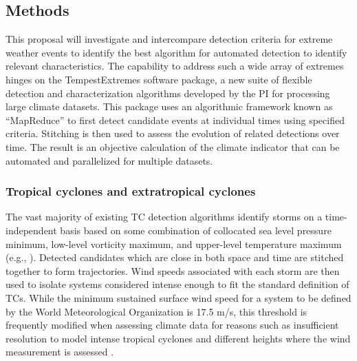 \documentclass[11pt]{article}
\begin{document}
\subsection{Methods} \label{sec:Methods}

This proposal will investigate and intercompare detection criteria for extreme weather events to identify the best algorithm for automated detection to identify relevant characteristics.  The capability to address such a wide array of extremes hinges on the TempestExtremes software package, a new suite of flexible detection and characterization algorithms developed by the PI for processing large climate datasets. This package uses an algorithmic framework known as ``MapReduce'' to first detect candidate events at individual times using specified criteria. Stitching is then used to assess the evolution of related detections over time. The result is an objective calculation of the climate indicator that can be automated and parallelized for multiple datasets.

\subsubsection{Tropical cyclones and extratropical cyclones}


The vast majority of existing TC detection algorithms identify storms on a time-independent basis based on some combination of collocated sea level pressure minimum, low-level vorticity maximum, and upper-level temperature maximum (e.g., \citet{Vitart1997,Oouchi2006,Bengtsson2007a,Knutson2007,Walsh2007,Tory2013a,Zarzycki2014AMIPTCs}). Detected candidates which are close in both space and time are stitched together to form trajectories. Wind speeds associated with each storm are then used to isolate systems considered intense enough to fit the standard definition of TCs. While the minimum sustained surface wind speed for a system to be defined by the World Meteorological Organization is 17.5 m/s, this threshold is frequently modified when assessing climate data for reasons such as insufficient resolution to model intense tropical cyclones and different heights where the wind measurement is assessed \citep{Walsh2007}.
\end{document}

